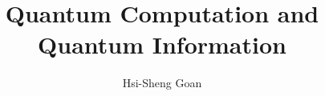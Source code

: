 \documentclass[]{book}
\title{\textbf{Quantum Computation and Quantum Information}}
\author{Hsi-Sheng Goan}
\date{}
\theoremstyle{nonumberplain}
\begin{document}
\maketitle
\tableofcontents

\end{document}
